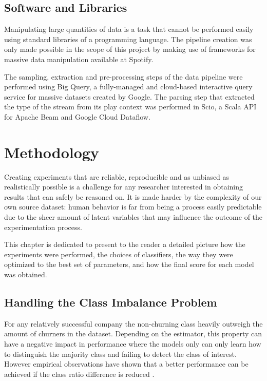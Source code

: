 \documentclass{kththesis}
\begin{document}
\section{Software and Libraries}

Manipulating large quantities of data is a task that cannot be performed easily using standard libraries of a programming language. The pipeline creation was only made possible in the scope of this project by making use of frameworks for massive data manipulation available at Spotify.

The sampling, extraction and pre-processing steps of the data pipeline were performed using Big Query\citep{sato2012inside}, a fully-managed and cloud-based interactive query service for massive datasets created by Google. The parsing step that extracted the type of the stream from its play context was performed in Scio\citep{scio}, a Scala API for Apache Beam and Google Cloud Dataflow.

\chapter{Methodology}

Creating experiments that are reliable, reproducible and as unbiased as realistically possible is a challenge for any researcher interested in obtaining results that can safely be reasoned on. It is made harder by the complexity of our own source dataset: human behavior is far from being a process easily predictable due to the sheer amount of latent variables that may influence the outcome of the experimentation process.

This chapter is dedicated to present to the reader a detailed picture how the experiments were performed, the choices of classifiers, the way they were optimized to the best set of parameters, and how the final score for each model was obtained.

\section{Handling the Class Imbalance Problem}

For any relatively successful company the non-churning class heavily outweigh the amount of churners in the dataset. Depending on the estimator, this property can have a negative impact in performance where the models only can only learn how to distinguish the majority class and failing to detect the class of interest. However empirical observations have shown that a better performance can be achieved if the class ratio difference is reduced \citep{Burez2009} \citep{ling1998data}. 
\end{document}

